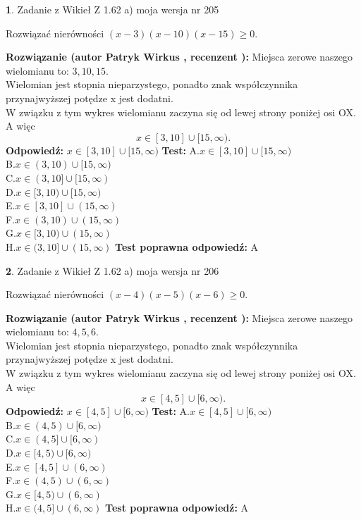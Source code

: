 \documentclass[12pt, a4paper]{article}
\theoremstyle{definition} %
\newtheorem{zad}{}
\newcommand{\zadStart}[1]{\begin{zad}#1\newline}
\newcommand{\zadStop}{\end{zad}}
\newcommand{\rozwStart}[2]{\noindent \textbf{Rozwiązanie (autor #1 , recenzent #2): }\newline}
\newcommand{\rozwStop}{\newline}
\newcommand{\odpStart}{\noindent \textbf{Odpowiedź:}\newline}
\newcommand{\odpStop}{\newline}
\newcommand{\testStart}{\noindent \textbf{Test:}\newline}
\newcommand{\testStop}{\newline}
\newcommand{\kluczStart}{\noindent \textbf{Test poprawna odpowiedź:}\newline}
\newcommand{\kluczStop}{\newline}
\begin{document}
\zadStart{Zadanie z Wikieł Z 1.62 a) moja wersja nr 205}

Rozwiązać nierówności $(x-3)(x-10)(x-15)\ge0$.
\zadStop
\rozwStart{Patryk Wirkus}{}
Miejsca zerowe naszego wielomianu to: $3, 10, 15$.\\
Wielomian jest stopnia nieparzystego, ponadto znak współczynnika przy\linebreak najwyższej potędze x jest dodatni.\\ W związku z tym wykres wielomianu zaczyna się od lewej strony poniżej osi OX. A więc $$x \in [3,10] \cup [15,\infty).$$
\rozwStop
\odpStart
$x \in [3,10] \cup [15,\infty)$
\odpStop
\testStart
A.$x \in [3,10] \cup [15,\infty)$\\
B.$x \in (3,10) \cup [15,\infty)$\\
C.$x \in (3,10] \cup [15,\infty)$\\
D.$x \in [3,10) \cup [15,\infty)$\\
E.$x \in [3,10] \cup (15,\infty)$\\
F.$x \in (3,10) \cup (15,\infty)$\\
G.$x \in [3,10) \cup (15,\infty)$\\
H.$x \in (3,10] \cup (15,\infty)$
\testStop
\kluczStart
A
\kluczStop



\zadStart{Zadanie z Wikieł Z 1.62 a) moja wersja nr 206}

Rozwiązać nierówności $(x-4)(x-5)(x-6)\ge0$.
\zadStop
\rozwStart{Patryk Wirkus}{}
Miejsca zerowe naszego wielomianu to: $4, 5, 6$.\\
Wielomian jest stopnia nieparzystego, ponadto znak współczynnika przy\linebreak najwyższej potędze x jest dodatni.\\ W związku z tym wykres wielomianu zaczyna się od lewej strony poniżej osi OX. A więc $$x \in [4,5] \cup [6,\infty).$$
\rozwStop
\odpStart
$x \in [4,5] \cup [6,\infty)$
\odpStop
\testStart
A.$x \in [4,5] \cup [6,\infty)$\\
B.$x \in (4,5) \cup [6,\infty)$\\
C.$x \in (4,5] \cup [6,\infty)$\\
D.$x \in [4,5) \cup [6,\infty)$\\
E.$x \in [4,5] \cup (6,\infty)$\\
F.$x \in (4,5) \cup (6,\infty)$\\
G.$x \in [4,5) \cup (6,\infty)$\\
H.$x \in (4,5] \cup (6,\infty)$
\testStop
\kluczStart
A
\kluczStop
\end{document}
